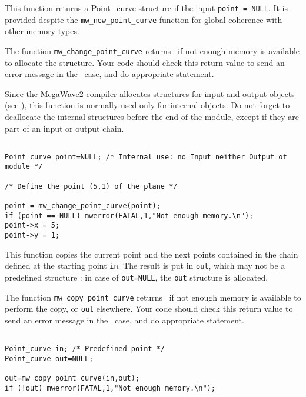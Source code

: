 \Description
This function returns a Point\_curve structure if the input \verb+point = NULL+.
It is provided despite the \verb+mw_new_point_curve+ function for
global coherence with other memory types.

The function \verb+mw_change_point_curve+ returns \Null\ if not enough memory is available to allocate the structure. 
Your code should check this return value to send an error message in the \Null\ case, and do appropriate statement.

Since the MegaWave2 compiler allocates structures for input and output 
objects (see \volI), this function is normally used only for internal objects.
Do not forget to deallocate the internal structures before the end
of the module, except if they are part of an input or output chain.

\Next
\Example
\begin{verbatim}

Point_curve point=NULL; /* Internal use: no Input neither Output of module */

/* Define the point (5,1) of the plane */

point = mw_change_point_curve(point);
if (point == NULL) mwerror(FATAL,1,"Not enough memory.\n");
point->x = 5;
point->y = 1;
\end{verbatim}

\newpage %


\Description
This function copies the current point and the next points contained in the chain 
defined at the starting point \verb+in+. The result is put in \verb+out+, which
may not be a predefined structure : in case of \verb+out=NULL+, the \verb+out+
structure is allocated.

The function \verb+mw_copy_point_curve+ returns \Null\ if not enough memory is available to perform
the copy, or \verb+out+ elsewhere.
Your code should check this return value to send an error message in the \Null\ case, and do appropriate statement.

\Next
\Example
\begin{verbatim}

Point_curve in; /* Predefined point */
Point_curve out=NULL; 

out=mw_copy_point_curve(in,out);
if (!out) mwerror(FATAL,1,"Not enough memory.\n");
\end{verbatim}

